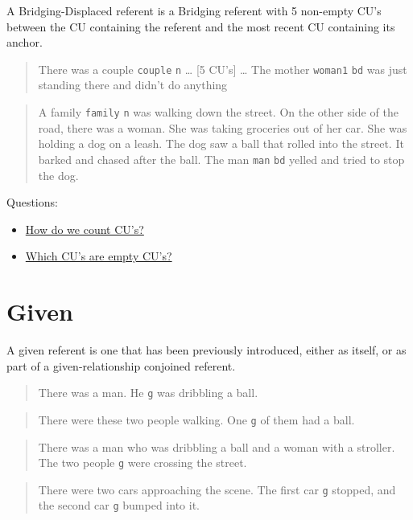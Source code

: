 \documentclass[
]{book}
\providecommand{\tightlist}{%
  \setlength{\itemsep}{0pt}\setlength{\parskip}{0pt}}
\begin{document}
A Bridging-Displaced referent is a Bridging referent with 5 non-empty CU's between the CU containing the referent and the most recent CU containing its anchor.

\begin{quote}
There was a couple \texttt{couple} \texttt{n} \ldots{}
{[}5 CU's{]} \ldots{}
The mother \texttt{woman1} \texttt{bd} was just standing there and didn't do anything
\end{quote}

\begin{quote}
A family \texttt{family} \texttt{n} was walking down the street.
On the other side of the road, there was a woman.
She was taking groceries out of her car.
She was holding a dog on a leash.
The dog saw a ball that rolled into the street.
It barked and chased after the ball.
The man \texttt{man} \texttt{bd} yelled and tried to stop the dog.
\end{quote}

Questions:

\begin{itemize}
\tightlist
\item
  \protect\hyperlink{counting-cus}{How do we count CU's?}
\item
  \protect\hyperlink{empty-cus}{Which CU's are empty CU's?}
\end{itemize}

\hypertarget{given}{%
\section{Given}\label{given}}

A given referent is one that has been previously introduced, either as itself, or as part of a given-relationship conjoined referent.

\begin{quote}
There was a man.
He \texttt{g} was dribbling a ball.
\end{quote}

\begin{quote}
There were these two people walking.
One \texttt{g} of them had a ball.
\end{quote}

\begin{quote}
There was a man who was dribbling a ball and a woman with a stroller.
The two people \texttt{g} were crossing the street.
\end{quote}

\begin{quote}
There were two cars approaching the scene.
The first car \texttt{g} stopped, and the second car \texttt{g} bumped into it.
\end{quote}
\end{document}
